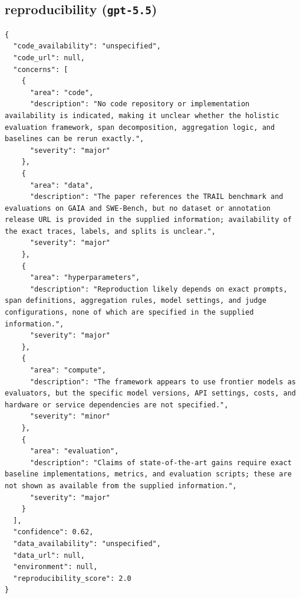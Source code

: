 \documentclass[11pt]{article}
\begin{document}
\subsection*{reproducibility (\texttt{gpt-5.5})}
\begin{verbatim}
{
  "code_availability": "unspecified",
  "code_url": null,
  "concerns": [
    {
      "area": "code",
      "description": "No code repository or implementation availability is indicated, making it unclear whether the holistic evaluation framework, span decomposition, aggregation logic, and baselines can be rerun exactly.",
      "severity": "major"
    },
    {
      "area": "data",
      "description": "The paper references the TRAIL benchmark and evaluations on GAIA and SWE-Bench, but no dataset or annotation release URL is provided in the supplied information; availability of the exact traces, labels, and splits is unclear.",
      "severity": "major"
    },
    {
      "area": "hyperparameters",
      "description": "Reproduction likely depends on exact prompts, span definitions, aggregation rules, model settings, and judge configurations, none of which are specified in the supplied information.",
      "severity": "major"
    },
    {
      "area": "compute",
      "description": "The framework appears to use frontier models as evaluators, but the specific model versions, API settings, costs, and hardware or service dependencies are not specified.",
      "severity": "minor"
    },
    {
      "area": "evaluation",
      "description": "Claims of state-of-the-art gains require exact baseline implementations, metrics, and evaluation scripts; these are not shown as available from the supplied information.",
      "severity": "major"
    }
  ],
  "confidence": 0.62,
  "data_availability": "unspecified",
  "data_url": null,
  "environment": null,
  "reproducibility_score": 2.0
}
\end{verbatim}
\end{document}
